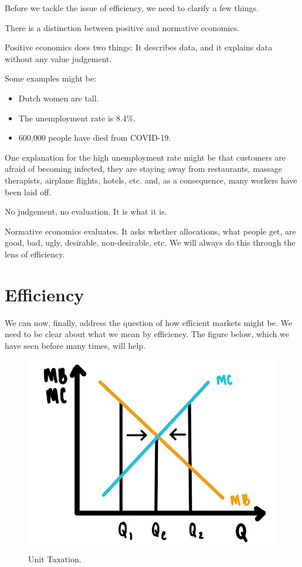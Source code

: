 \documentclass[
]{book}
\providecommand{\tightlist}{%
  \setlength{\itemsep}{0pt}\setlength{\parskip}{0pt}}
\begin{document}
Before we tackle the issue of efficiency, we need to clarify a few things.

There is a distinction between positive and normative economics.

Positive economics does two things: It describes data, and it explains data without any value judgement.

Some examples might be:

\begin{itemize}
\tightlist
\item
  Dutch women are tall.
\item
  The unemployment rate is 8.4\%.
\item
  600,000 people have died from COVID-19.
\end{itemize}

One explanation for the high unemployment rate might be that customers are afraid of becoming infected, they are staying away from restaurants, massage therapists, airplane flights, hotels, etc. and, as a consequence, many workers have been laid off.

No judgement, no evaluation. It is what it is.

Normative economics evaluates. It asks whether allocations, what people get, are good, bad, ugly, desirable, non-desirable, etc. We will always do this through the lens of efficiency.

\hypertarget{efficiency}{%
\section{Efficiency}\label{efficiency}}

We can now, finally, address the question of how efficient markets might be. We need to be clear about what we mean by efficiency. The figure below, which we have seen before many times, will help.

\begin{figure}

{\centering \includegraphics[width=1\linewidth]{img/compmarkets/fig11} 

}

\caption{Unit Taxation.}\label{fig:compmarkets11}
\end{figure}
\end{document}
